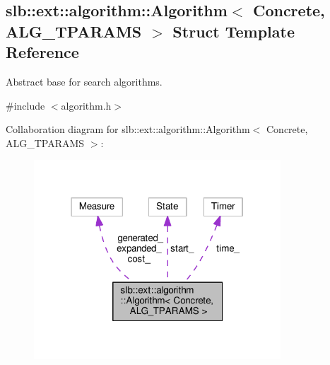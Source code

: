 \hypertarget{structslb_1_1ext_1_1algorithm_1_1Algorithm}{}\subsection{slb\+:\+:ext\+:\+:algorithm\+:\+:Algorithm$<$ Concrete, A\+L\+G\+\_\+\+T\+P\+A\+R\+A\+MS $>$ Struct Template Reference}
\label{structslb_1_1ext_1_1algorithm_1_1Algorithm}


Abstract base for search algorithms.  




{\ttfamily \#include $<$algorithm.\+h$>$}



Collaboration diagram for slb\+:\+:ext\+:\+:algorithm\+:\+:Algorithm$<$ Concrete, A\+L\+G\+\_\+\+T\+P\+A\+R\+A\+MS $>$\+:\nopagebreak
\begin{figure}[H]
\begin{center}
\leavevmode
\includegraphics[width=262pt]{structslb_1_1ext_1_1algorithm_1_1Algorithm__coll__graph}
\end{center}
\end{figure}

